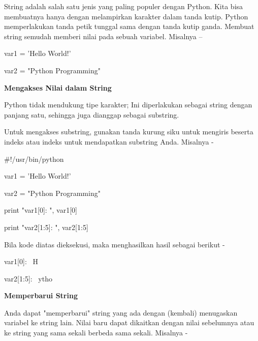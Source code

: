 \documentclass[a4paper,12pt]{report}
\begin{document}
\vspace{12pt}
\noindent 
String adalah salah satu jenis yang paling populer dengan Python. Kita bisa membuatnya hanya dengan melampirkan karakter dalam tanda kutip. Python memperlakukan tanda petik tunggal sama dengan tanda kutip ganda. Membuat string semudah memberi nilai pada sebuah variabel. Misalnya – \par
\noindent 
\vspace{12pt}
\noindent 
var1 = 'Hello World!' \par
\noindent 
var2 = "Python Programming" \par
\vspace{12pt}
\noindent 
\textbf{Mengakses Nilai dalam String} \par
\noindent 
\vspace{12pt}
\noindent 
Python tidak mendukung tipe karakter; Ini diperlakukan sebagai string dengan panjang satu, sehingga juga dianggap sebagai substring. \par
\noindent 
Untuk mengakses substring, gunakan tanda kurung siku untuk mengiris beserta indeks atau indeks untuk mendapatkan substring Anda. Misalnya - \par
\vspace{12pt}
\noindent 
 $  \#  $!/usr/bin/python \par
\vspace{12pt}
\noindent 
var1 = 'Hello World!' \par
\noindent 
var2 = "Python Programming" \par
\vspace{12pt}
\noindent 
print "var1[0]: ", var1[0] \par
\noindent 
print "var2[1:5]: ", var2[1:5] \par
\vspace{12pt}
\noindent 
Bila kode diatas dieksekusi, maka menghasilkan hasil sebagai berikut - \par
\vspace{12pt}
\noindent 
var1[0]:~ H \par
\noindent 
var2[1:5]:~ ytho \par
\noindent 
\textbf{Memperbarui String} \par
\vspace{12pt}
\noindent 
Anda dapat "memperbarui" string yang ada dengan (kembali) menugaskan variabel ke string lain. Nilai baru dapat dikaitkan dengan nilai sebelumnya atau ke string yang sama sekali berbeda sama sekali. Misalnya - \par
\vspace{12pt}
\end{document}
